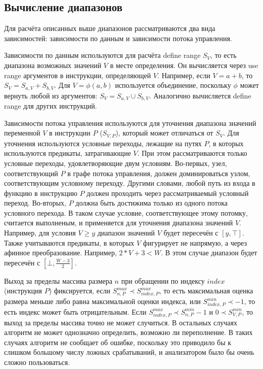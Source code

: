 \subsection{Вычисление диапазонов}

Для расчёта описанных выше диапазонов рассматриваются два вида
зависимостей: зависимости по данным и зависимости потока управления.

Зависимости по данным используются для расчёта define range $S_V$, то
есть диапазона возможных значений $V$ в месте определения. Он
вычисляется через use range аргументов в инструкции, определяющей
$V$. Например, если $V = a + b$, то $S_V = S_{a, V} + S_{b, V}$. Для
$V = \phi(a, b)$ используется объединение, поскольку $\phi$ может
вернуть любой из аргументов: $S_V = S_{a, V} \cup S_{b, V}$. Аналогично
вычисляется define range для других инструкций.

Зависимости потока управления используются для уточнения диапазона
значений переменной $V$ в инструкции $P$ ($S_{V, P}$), который может
отличаться от $S_V$. Для уточнения используются условные переходы,
лежащие на путях $P$, в которых используются предикаты, затрагивающие
$V$. При этом рассматриваются только условные переходы,
удовлетворяющие двум условиям. Во-первых, узел, соответствующий $P$ в
графе потока управления, должен доминироваться узлом, соответствующим
условному переходу. Другими словами, любой путь из входа в функцию в
инструкцию $P$ должен проходить через рассматриваемый условный
переход. Во-вторых, $P$ должна быть достижима только из одного потока
условного перехода. В таком случае условие, соответствующее этому
потомку, считается выполненым, и применяется для уточнения диапазона
значений $V$. Например, для условия $V \geq y$ диапазон значений $V$
будет пересечён с $[y, \top]$. Также учитываются предикаты, в которых
$V$ фигурирует не напрямую, а через афинное преобразование. Например,
$2 * V + 3 < W$. В этом случае диапазон будет пересечён с $[\bot,
\frac{W - 3}{2}]$.

Выход за пределы массива размера $n$ при обращении по индексу $index$
(инструкция $P$) фиксируется, если
$S_{n, P}^{max} \prec S_{index, P}^{max}$, то есть максимальная оценка
размера меньше либо равна максимальной оценки индекса, или $S_{index, P}^{min} \prec
-1$, то есть индекс может быть отрицательным. Если $S_{index, P}^{max}
\prec S_{n, P}^{min} - 1$ и $0 \prec S_{V, P}^{min}$, то выход за
пределы массива точно не может случиться. В остальных случаях алгоритм
не может однозначно определить, возможно ли переполнение. В таких
случаях алгоритм не сообщает об ошибке, поскольку это приводило бы к
слишком большому числу ложных срабатываний, и анализатором было бы
очень сложно пользоваться.

